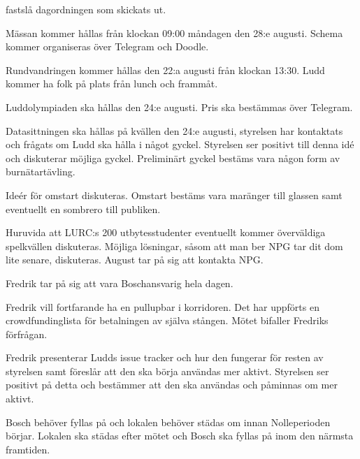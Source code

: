 \documentclass{protokoll}
\begin{document}
\newpage  


\begin{beslut}
     \att fastslå dagordningen som skickats ut.
\end{beslut}

Mässan kommer hållas från klockan 09:00 måndagen den 28:e augusti. Schema kommer organiseras över Telegram och Doodle.

Rundvandringen kommer hållas den 22:a augusti från klockan 13:30. Ludd kommer ha folk på plats från lunch och frammåt.

Luddolympiaden ska hållas den 24:e augusti. Pris ska bestämmas över Telegram.

Datasittningen ska hållas på kvällen den 24:e augusti, styrelsen har kontaktats och frågats om Ludd ska hålla i något gyckel. Styrelsen ser positivt till denna idé och diskuterar möjliga gyckel. Preliminärt gyckel bestäms vara någon form av burnätartävling.  

Ideér för omstart diskuteras. Omstart bestäms vara maränger till glassen samt eventuellt en sombrero till publiken.

Huruvida att LURC:s 200 utbytesstudenter eventuellt kommer överväldiga spelkvällen diskuteras. Möjliga lösningar, såsom att man ber NPG tar dit dom lite senare, diskuteras. August tar på sig att kontakta NPG.  

Fredrik tar på sig att vara Boschansvarig hela dagen.

Fredrik vill fortfarande ha en pullupbar i korridoren. Det har uppförts en crowdfundinglista för betalningen av själva stången. 
Mötet bifaller Fredriks förfrågan.

Fredrik presenterar Ludds issue tracker och hur den fungerar för resten av styrelsen samt föreslår att den ska börja användas mer aktivt. Styrelsen ser positivt på detta och bestämmer att den ska användas och påminnas om mer aktivt. 

Bosch behöver fyllas på och lokalen behöver städas om innan Nolleperioden börjar. Lokalen ska städas efter mötet och Bosch ska fyllas på inom den närmsta framtiden.
\end{document}
